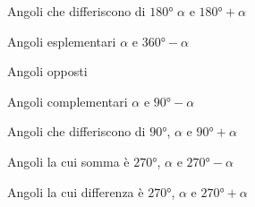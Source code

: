 \begin{figure}
	\centering
	
	\caption{Angoli che differiscono di $\ang{180}$ $\alpha$ e $\ang{180}+\alpha$}
	\label{fig:graficiAngoliAssociatidiff180}
\end{figure}
\begin{figure} %
	\centering
	
	\caption{Angoli esplementari $\alpha$ e $\ang{360}-\alpha$}
	\label{fig:graficiAngolidif360}
\end{figure}
\begin{figure} %
	\centering
	
	\caption{Angoli opposti}
	\label{fig:graficiangoliopposti}
\end{figure}
\begin{figure} %
	\centering
	
	\caption{Angoli complementari $\alpha$ e  $\ang{90}-\alpha$}
	\label{fig:graficiangolicomplementari1}
\end{figure}
\begin{figure} %
	\centering
	
	\caption{Angoli che differiscono di $\ang{90}$, $\alpha$ e $\ang{90}+\alpha$}
	\label{fig:graficiangolicomplementari2}
\end{figure}
\begin{figure} %
	\centering
	
	\caption{Angoli la cui somma è $\ang{270}$,  $\alpha$ e $\ang{270}-\alpha$}
	\label{tab:graficiangolicomplementari3}
\end{figure}
\begin{figure} %
	\centering
	
	\caption{Angoli la cui differenza è $\ang{270}$, $\alpha$ e $\ang{270}+\alpha$}
	\label{tab:graficiangolicomplementari4}
\end{figure}
